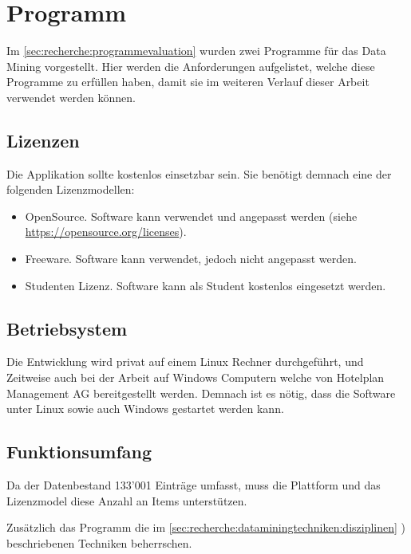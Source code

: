 \section{Programm}
\label{sec:anforderungsanalyse:programm}
Im \cref{sec:recherche:programmevaluation}  wurden zwei Programme für das Data Mining vorgestellt. Hier werden die Anforderungen aufgelistet, welche diese Programme zu erfüllen haben, damit sie im weiteren Verlauf dieser Arbeit verwendet werden können.

\subsection{Lizenzen}
\label{sec:anforderungsanalyse:programm:lizenzen}
Die Applikation sollte kostenlos einsetzbar sein. Sie benötigt demnach eine der folgenden Lizenzmodellen:
\begin{itemize}
\item OpenSource. Software kann verwendet und angepasst werden (siehe \url{https://opensource.org/licenses}).
\item Freeware. Software kann verwendet, jedoch nicht angepasst werden.
\item Studenten Lizenz. Software kann als Student kostenlos eingesetzt werden.
\end{itemize}

\subsection{Betriebsystem}
\label{sec:anforderungsanalyse:programm:betriebsystem}
Die Entwicklung wird privat auf einem Linux Rechner durchgeführt, und Zeitweise auch bei der Arbeit auf Windows Computern welche von Hotelplan Management AG bereitgestellt werden.
Demnach ist es nötig, dass die Software unter Linux sowie auch Windows gestartet werden kann.

\subsection{Funktionsumfang}
\label{sec:anforderungsanalyse:programm:funktionsumfang}
Da der Datenbestand 133'001 Einträge umfasst, muss die Plattform und das Lizenzmodel diese Anzahl an Items unterstützen.

Zusätzlich das Programm die im \cref{sec:recherche:dataminingtechniken:disziplinen} ) beschriebenen Techniken beherrschen. 

